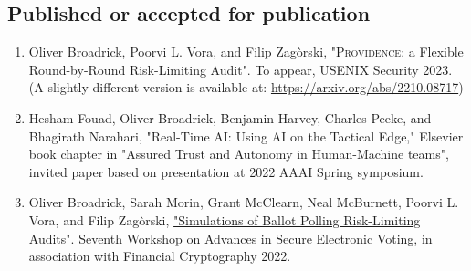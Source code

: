 \documentclass[letterpaper]{article}
\begin{document}
\subsection*{Published or accepted for publication}
\begin{enumerate}
\item
Oliver Broadrick, Poorvi L. Vora, and Filip Zag\`{o}rski, "\textsc{Providence}: a Flexible Round-by-Round Risk-Limiting Audit". To appear, USENIX Security 2023. (A slightly different version is available at: \newline \href{https://arxiv.org/abs/2210.08717}{https://arxiv.org/abs/2210.08717})
\item
Hesham Fouad, Oliver Broadrick, Benjamin Harvey, Charles Peeke, and Bhagirath Narahari, "Real-Time AI: Using AI on the Tactical Edge," Elsevier book chapter in "Assured Trust and Autonomy in Human-Machine teams", invited paper based on presentation at 2022 AAAI Spring symposium.
\item Oliver Broadrick, Sarah Morin, Grant McClearn, Neal McBurnett, Poorvi L. Vora, and Filip Zag\`{o}rski, \href{https://oliverbroadrick.com/papers/simulations-of-ballot-polling-rlas.pdf}{"Simulations of Ballot Polling Risk-Limiting Audits"}. Seventh Workshop on Advances in Secure Electronic Voting, in association with Financial Cryptography 2022.
\end{enumerate}

\bigskip
\end{document}
